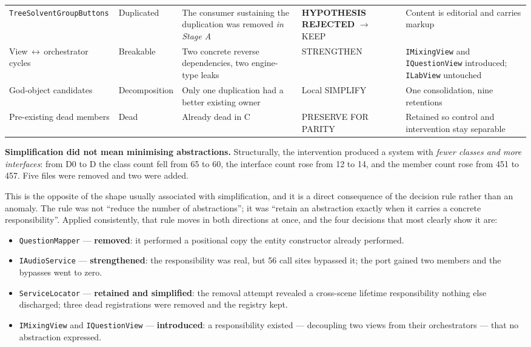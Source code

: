 \documentclass{sbc2019}%
\begin{document}
\begin{table}[t]
\begin{tabular}{p{}p{}p{}p{}p{}}
\texttt{TreeSolvent\allowbreak{}GroupButtons} & Duplicated & The consumer sustaining the duplication was removed \emph{in Stage A} & \textbf{HYPOTHESIS REJECTED} $\rightarrow$ KEEP & Content is editorial and carries markup \\
\addlinespace
View\,$\leftrightarrow$\,orchestrator cycles & Breakable & Two concrete reverse dependencies, two engine-type leaks & STRENGTHEN & \texttt{IMixingView} and \texttt{IQuestionView} introduced; \texttt{ILabView} untouched \\
\addlinespace
God-object candidates & Decomposition & Only one duplication had a better existing owner & Local SIMPLIFY & One consolidation, nine retentions \\
\addlinespace
Pre-existing dead members & Dead & Already dead in C & PRESERVE FOR PARITY & Retained so control and intervention stay separable \\
\bottomrule
\end{tabular}
\end{table}

\medskip\noindent\textbf{Simplification did not mean minimising abstractions.}
Structurally, the intervention produced a system with \emph{fewer classes and
more interfaces}: from D0 to D the class count fell from 65 to 60, the interface
count rose from 12 to 14, and the member count rose from 451 to 457. Five files
were removed and two were added.

This is the opposite of the shape usually associated with simplification, and it
is a direct consequence of the decision rule rather than an anomaly. The rule was
not ``reduce the number of abstractions''; it was ``retain an abstraction exactly
when it carries a concrete responsibility''. Applied consistently, that rule
moves in both directions at once, and the four decisions that most clearly show
it are:

\begin{itemize}\itemsep2pt
\item \texttt{QuestionMapper} --- \textbf{removed}: it performed a positional
copy the entity constructor already performed.
\item \texttt{IAudioService} --- \textbf{strengthened}: the responsibility was
real, but 56 call sites bypassed it; the port gained two members and the bypasses
went to zero.
\item \texttt{ServiceLocator} --- \textbf{retained and simplified}: the removal
attempt revealed a cross-scene lifetime responsibility nothing else discharged;
three dead registrations were removed and the registry kept.
\item \texttt{IMixingView} and \texttt{IQuestionView} --- \textbf{introduced}:
a responsibility existed --- decoupling two views from their orchestrators --- that
no abstraction expressed.
\end{itemize}
\end{document}

